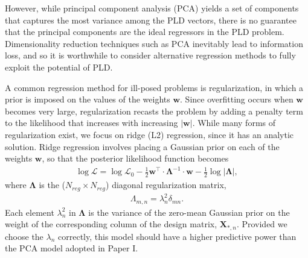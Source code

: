 \documentclass[]{emulateapj}
\begin{document}
However, while principal component analysis (PCA) yields a set of components that captures 
the most variance among the PLD vectors, there is no guarantee that the principal components
are the ideal regressors in the PLD problem. Dimensionality reduction techniques such as PCA
inevitably lead to information loss, and so it is worthwhile to consider alternative
regression methods to fully exploit the potential of PLD.

A common regression method for ill-posed problems is regularization, in which a prior is imposed
on the values of the weights $\mathbf{w}$. Since overfitting occurs when $\mathbf{w}$ becomes very
large, regularization recasts the problem by adding a penalty term to the likelihood that 
increases with increasing $|\mathbf{w}|$. While many forms of regularization exist, we focus on
ridge (L2) regression, since it has an analytic solution. Ridge regression involves placing a
Gaussian prior on each of the weights $\mathbf{w}$, so that the posterior likelihood function becomes
%
\begin{align}
\label{eq:like}
\log\mathcal{L} =  \log\mathcal{L}_0
                   -\frac{1}{2}
                   \mathbf{w}^\top \cdot \mathbf{\Lambda}^{-1} \cdot \mathbf{w}
                   -\frac{1}{2} \log\left|\mathbf{\Lambda}\right|,
\end{align}
%
where $\mathbf{\Lambda}$ is the ($N_{reg} \times N_{reg}$) diagonal regularization matrix,
%
\begin{align}
\label{eq:Lambda}
\Lambda_{m,n} = \lambda_{n}^2\delta_{mn}.
\end{align}
%
Each element $\lambda_n^2$ in $\mathbf{\Lambda}$ is the variance of the 
zero-mean Gaussian prior on the weight of the corresponding column of the design matrix, 
$\mathbf{X}_{*,n}$. Provided we choose the $\lambda_{n}$ correctly, this model should 
have a higher predictive power than the PCA model adopted in Paper I.
\end{document}
